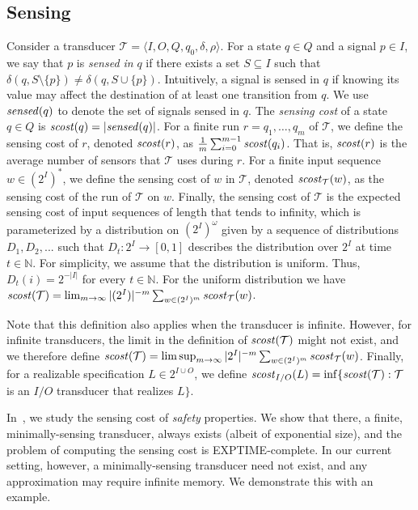 \documentclass[runningheads,a4paper]{llncs}
\newcommand{\set}[1]{{\{#1\}}}
\newcommand{\Nat}{\mathbb{N}}
\newcommand{\zug}[1]{\langle #1  \rangle}
\newcommand{\T}{{\mathcal T}}
\newcommand{\sen}{{\it sensed}}
\newcommand{\scost}{{\it scost}}
\newcommand{\stcost}{{\it scost}}
\newcommand{\tIN}{{2^I}}
\begin{document}
\subsection{Sensing}
\label{sec:sensing}
Consider a transducer  $\T=\zug{I,O,Q,q_0,\delta,\rho}$. For a state $q\in Q$ and a signal $p\in I$, we say that $p$ is {\em sensed in\/} $q$ if there exists a set $S\subseteq I$ such that $\delta(q,S  \setminus\set{p})\neq \delta(q,S\cup \set{p})$. Intuitively, a signal is sensed in $q$ if knowing its value may affect the destination of at least one transition from $q$. We use $\sen(q)$ to denote the set of signals sensed in $q$. 
The {\em sensing cost\/} of a state $q\in Q$ is $\stcost(q)=|\sen(q)|$. 
For a finite run $r=q_1,\ldots,q_m$ of $\T$, we define the sensing cost of $r$, denoted $\scost( r)$, as $\frac{1}{m}\sum_{i=0}^{m-1}{\stcost(q_i)}$. That is, $\scost(r)$ is the average number of sensors that $\T$ uses during $r$. For a finite input sequence $w \in (2^I)^*$, we define the sensing cost of $w$ in $\T$, denoted $\scost_{\T}(w)$, as the sensing cost of the run of $\T$ on $w$. 
Finally, the sensing cost of $\T$ is the expected sensing cost of input sequences of length that tends to infinity, which is parameterized by a distribution 
on $(\tIN)^\omega$ given by a sequence of distributions $D_1,D_2,...$ such that $D_t:\tIN\to [0,1]$ describes the distribution over $\tIN$ at time $t\in \Nat$. For simplicity, we assume that the distribution is uniform. Thus, $D_t(i)=2^{-|I|}$ for every $t\in \Nat$. 
For the uniform distribution we have $\scost(\T)=\lim_{m\to \infty} |(2^I)|^{-m}\sum_{w \in (2^I)^m} \scost_{\T}(w)$. 

Note that this definition also applies when the transducer is infinite. However, for infinite transducers, the limit in the definition of $\scost(\T)$ might not exist, and we therefore define $\scost(\T)=\limsup_{m\to \infty}|\tIN|^{-m}\sum_{w\in (\tIN)^m}\scost_\T(w)$. Finally, for a realizable specification $L\in 2^{I\cup O}$, we define $\scost_{I/O}(L)=\inf\{\scost(\T): \T $ is an $I/O$ transducer that realizes $L\}$.

In~\cite{AKK15}, we study the sensing cost of {\em safety} properties. 
We show that there, a finite, minimally-sensing transducer, always exists (albeit of exponential size), and the problem of computing the sensing cost is EXPTIME-complete. In our current setting, however, a minimally-sensing transducer need not exist, and 
any approximation may require infinite memory. 
We demonstrate this with an example. 
\end{document}
